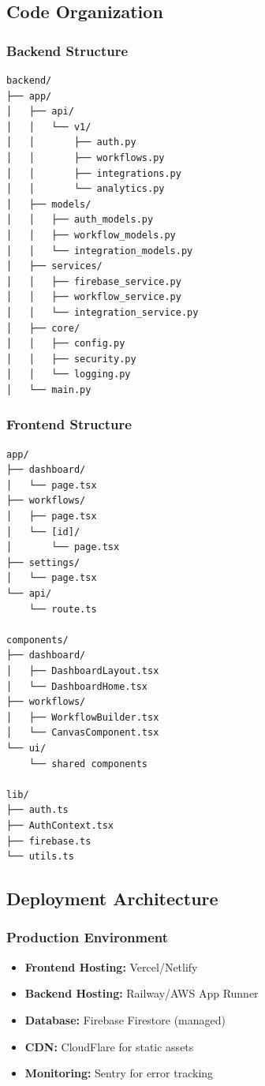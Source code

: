 \documentclass[12pt,a4paper]{article}
\begin{document}
\newpage

\subsection{Code Organization}

\subsubsection{Backend Structure}
\begin{verbatim}
backend/
├── app/
│   ├── api/
│   │   └── v1/
│   │       ├── auth.py
│   │       ├── workflows.py
│   │       ├── integrations.py
│   │       └── analytics.py
│   ├── models/
│   │   ├── auth_models.py
│   │   ├── workflow_models.py
│   │   └── integration_models.py
│   ├── services/
│   │   ├── firebase_service.py
│   │   ├── workflow_service.py
│   │   └── integration_service.py
│   ├── core/
│   │   ├── config.py
│   │   ├── security.py
│   │   └── logging.py
│   └── main.py
\end{verbatim}

\subsubsection{Frontend Structure}
\begin{verbatim}
app/
├── dashboard/
│   └── page.tsx
├── workflows/
│   ├── page.tsx
│   └── [id]/
│       └── page.tsx
├── settings/
│   └── page.tsx
└── api/
    └── route.ts

components/
├── dashboard/
│   ├── DashboardLayout.tsx
│   └── DashboardHome.tsx
├── workflows/
│   ├── WorkflowBuilder.tsx
│   └── CanvasComponent.tsx
└── ui/
    └── shared components

lib/
├── auth.ts
├── AuthContext.tsx
├── firebase.ts
└── utils.ts
\end{verbatim}

\newpage

\subsection{Deployment Architecture}

\subsubsection{Production Environment}
\begin{itemize}
    \item \textbf{Frontend Hosting:} Vercel/Netlify
    \item \textbf{Backend Hosting:} Railway/AWS App Runner
    \item \textbf{Database:} Firebase Firestore (managed)
    \item \textbf{CDN:} CloudFlare for static assets
    \item \textbf{Monitoring:} Sentry for error tracking
\end{itemize}
\end{document}
